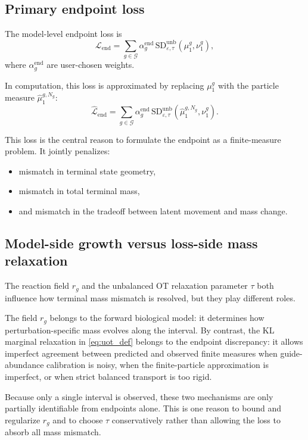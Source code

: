 \documentclass[11pt]{article}
\newcommand{\SDunb}{\mathrm{SD}^{\mathrm{unb}}}
\newcommand{\Gcal}{\mathcal{G}}
\begin{document}
\subsection{Primary endpoint loss}

The model-level endpoint loss is
\begin{equation}
\mathcal{L}_{\mathrm{end}}
=
\sum_{g\in\Gcal}
\alpha_g^{\mathrm{end}}
\,\SDunb_{\varepsilon,\tau}\!\left(\mu_1^g,\nu_1^g\right),
\label{eq:L_end}
\end{equation}
where $\alpha_g^{\mathrm{end}}$ are user-chosen weights.

In computation, this loss is approximated by replacing $\mu_1^g$ with the particle measure $\hat\mu_1^{g,N_g}$:
\begin{equation}
\widehat{\mathcal{L}}_{\mathrm{end}}
=
\sum_{g\in\Gcal}
\alpha_g^{\mathrm{end}}
\,\SDunb_{\varepsilon,\tau}\!\left(\hat\mu_1^{g,N_g},\nu_1^g\right).
\label{eq:L_end_particle}
\end{equation}

This loss is the central reason to formulate the endpoint as a finite-measure problem. It jointly penalizes:
\begin{itemize}[leftmargin=2em]
    \item mismatch in terminal state geometry,
    \item mismatch in total terminal mass,
    \item and mismatch in the tradeoff between latent movement and mass change.
\end{itemize}

\subsection{Model-side growth versus loss-side mass relaxation}

The reaction field $r_g$ and the unbalanced OT relaxation parameter $\tau$ both influence how terminal mass mismatch is resolved, but they play different roles.

The field $r_g$ belongs to the forward biological model: it determines how perturbation-specific mass evolves along the interval. By contrast, the KL marginal relaxation in \cref{eq:uot_def} belongs to the endpoint discrepancy: it allows imperfect agreement between predicted and observed finite measures when guide-abundance calibration is noisy, when the finite-particle approximation is imperfect, or when strict balanced transport is too rigid.

Because only a single interval is observed, these two mechanisms are only partially identifiable from endpoints alone. This is one reason to bound and regularize $r_g$ and to choose $\tau$ conservatively rather than allowing the loss to absorb all mass mismatch.
\end{document}
